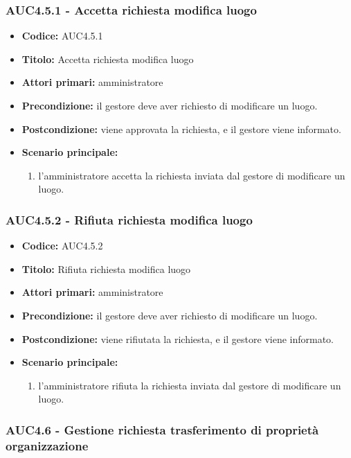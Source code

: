 \documentclass[casi-duso]{subfiles}
\begin{document}
\subsubsection{AUC4.5.1 - Accetta richiesta modifica luogo}%
\label{subsub:AUC4.5.1}
\begin{itemize}
  \item \textbf{Codice:} AUC4.5.1
  \item \textbf{Titolo:} Accetta richiesta modifica luogo
  \item \textbf{Attori primari:} amministratore
  \item \textbf{Precondizione:} il gestore deve aver richiesto di modificare un luogo.
  \item \textbf{Postcondizione:} viene approvata la richiesta, e il gestore viene informato.
  \item \textbf{Scenario principale:}
  \begin{enumerate}
    \item  l'amministratore accetta la richiesta inviata dal gestore di modificare un luogo.
  \end{enumerate}
\end{itemize}

\subsubsection{AUC4.5.2 - Rifiuta richiesta modifica luogo}%
\label{subsub:AUC4.5.2}
\begin{itemize}
  \item \textbf{Codice:} AUC4.5.2
  \item \textbf{Titolo:} Rifiuta richiesta modifica luogo
  \item \textbf{Attori primari:} amministratore
  \item \textbf{Precondizione:} il gestore deve aver richiesto di modificare un luogo.
  \item \textbf{Postcondizione:} viene rifiutata la richiesta, e il gestore viene informato.
  \item \textbf{Scenario principale:}
  \begin{enumerate}
    \item l'amministratore rifiuta la richiesta inviata dal gestore di modificare un luogo.
  \end{enumerate}
\end{itemize}

\subsubsection{AUC4.6 - Gestione richiesta trasferimento di proprietà organizzazione}%
\label{subsub:AUC4.6}
\end{document}
